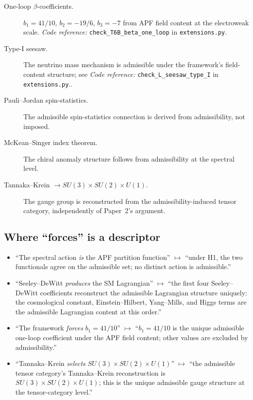 \documentclass[11pt]{article}
\newcommand{\coderef}[2]{\smallskip\noindent\textit{Code reference:} \texttt{#1} in \texttt{#2}.}
\begin{document}
\begin{description}
    \item[One-loop $\beta$-coefficients.] $b_1 = 41/10$, $b_2 = -19/6$, $b_3 = -7$ from APF field content at the electroweak scale. \coderef{check\_T6B\_beta\_one\_loop}{extensions.py}
    \item[Type-I seesaw.] The neutrino mass mechanism is admissible under the framework's field-content structure; see \coderef{check\_L\_seesaw\_type\_I}{extensions.py}.
    \item[Pauli--Jordan spin-statistics.] The admissible spin-statistics connection is derived from admissibility, not imposed.
    \item[McKean--Singer index theorem.] The chiral anomaly structure follows from admissibility at the spectral level.
    \item[Tannaka--Krein $\to SU(3) \times SU(2) \times U(1)$.] The gauge group is reconstructed from the admissibility-induced tensor category, independently of Paper~2's argument.
\end{description}

\subsection{Where ``forces'' is a descriptor}\label{sec:P7_forces}

\begin{itemize}
    \item ``The spectral action \emph{is} the APF partition function'' $\longmapsto$ ``under H1, the two functionals agree on the admissible set; no distinct action is admissible.''
    \item ``Seeley--DeWitt \emph{produces} the SM Lagrangian'' $\longmapsto$ ``the first four Seeley--DeWitt coefficients reconstruct the admissible Lagrangian structure uniquely: the cosmological constant, Einstein--Hilbert, Yang--Mills, and Higgs terms are the admissible Lagrangian content at this order.''
    \item ``The framework \emph{forces} $b_1 = 41/10$'' $\longmapsto$ ``$b_1 = 41/10$ is the unique admissible one-loop coefficient under the APF field content; other values are excluded by admissibility.''
    \item ``Tannaka--Krein \emph{selects} $SU(3) \times SU(2) \times U(1)$'' $\longmapsto$ ``the admissible tensor category's Tannaka--Krein reconstruction is $SU(3) \times SU(2) \times U(1)$; this is the unique admissible gauge structure at the tensor-category level.''
\end{itemize}
\end{document}
